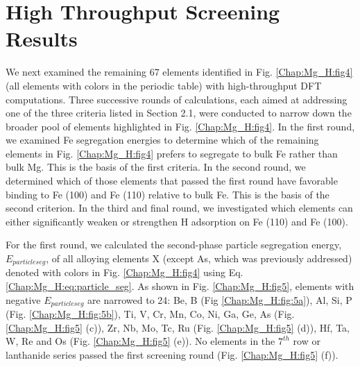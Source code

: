 \section{High Throughput Screening Results}

We next examined the remaining 67 elements identified in Fig. \ref{Chap:Mg_H:fig4} (all elements with colors in the periodic table) with high-throughput DFT computations. Three successive rounds of calculations, each aimed at addressing one of the three criteria listed in Section 2.1, were conducted to narrow down the broader pool of elements highlighted in Fig. \ref{Chap:Mg_H:fig4}. In the first round, we examined Fe segregation energies to determine which of the remaining elements in Fig. \ref{Chap:Mg_H:fig4} prefers to segregate to bulk Fe rather than bulk Mg. This is the basis of the first criteria. In the second round, we determined which of those elements that passed the first round have favorable binding to Fe (100) and Fe (110) relative to bulk Fe. This is the basis of the second criterion. In the third and final round, we investigated which elements can either significantly weaken or strengthen H adsorption on Fe (110) and Fe (100).


For the first round, we calculated the second-phase particle segregation energy, $E_{particle seg}$,  of all alloying elements X (except As, which was previously addressed) denoted with colors in Fig. \ref{Chap:Mg_H:fig4} using Eq. \ref{Chap:Mg_H:eq:particle_seg}. As shown in Fig. \ref{Chap:Mg_H:fig5}, elements with negative $E_{particle seg}$ are narrowed to 24: Be, B (Fig \ref{Chap:Mg_H:fig:5a}), Al, Si, P (Fig. \ref{Chap:Mg_H:fig:5b}), Ti, V, Cr, Mn, Co, Ni, Ga, Ge, As (Fig. \ref{Chap:Mg_H:fig5} (c)), Zr, Nb, Mo, Tc, Ru (Fig. \ref{Chap:Mg_H:fig5} (d)), Hf, Ta, W, Re and Os (Fig. \ref{Chap:Mg_H:fig5} (e)). No elements in the $7^{th}$ row or lanthanide series passed the first screening round (Fig. \ref{Chap:Mg_H:fig5} (f)).


